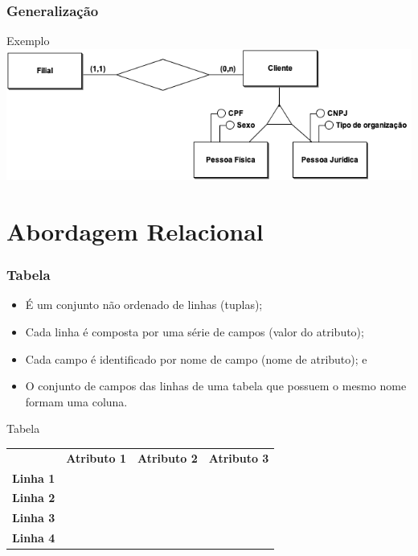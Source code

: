 \documentclass{beamer}
\begin{document}
\begin{frame}
\frametitle{Generalização}

\begin{exampleblock}{Exemplo}
	\centering
	\includegraphics[scale=2]{img/generalizacao}
\end{exampleblock}
\end{frame}

\section{Abordagem Relacional}

\begin{frame}
\frametitle{Tabela}

\begin{itemize}
	\item É um conjunto não ordenado de linhas (tuplas);
	\item Cada linha é composta por uma série de campos (valor do atributo);
	\item Cada campo é identificado por nome de campo (nome de atributo); e
	\item O conjunto de campos das linhas de uma tabela que possuem o
	mesmo nome formam uma coluna.
\end{itemize}\vfill

\begin{exampleblock}{Tabela}
	\centering
	\begin{tabular}{l|c|c|c|}
		\cline{2-4}
		 & \textbf{Atributo 1} & \textbf{Atributo 2} & \textbf{Atributo 3} \\ \cline{2-4}
		\textbf{Linha 1} & & & \\ \cline{2-4}
		\textbf{Linha 2} &  & &\\ \cline{2-4}
		\textbf{Linha 3} & & & \\ \cline{2-4}
		\textbf{Linha 4} & & & \\ \cline{2-4}
	\end{tabular}
\end{exampleblock}		
\end{frame}
\end{document}

